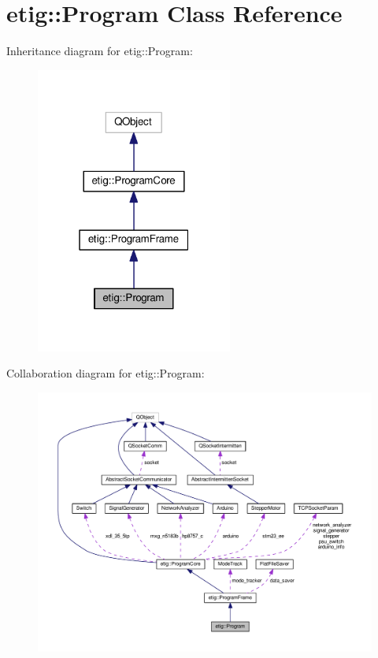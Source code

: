 \hypertarget{classetig_1_1_program}{}\section{etig\+:\+:Program Class Reference}
\label{classetig_1_1_program}


Inheritance diagram for etig\+:\+:Program\+:\nopagebreak
\begin{figure}[H]
\begin{center}
\leavevmode
\includegraphics[width=183pt]{classetig_1_1_program__inherit__graph}
\end{center}
\end{figure}


Collaboration diagram for etig\+:\+:Program\+:\nopagebreak
\begin{figure}[H]
\begin{center}
\leavevmode
\includegraphics[width=350pt]{classetig_1_1_program__coll__graph}
\end{center}
\end{figure}

